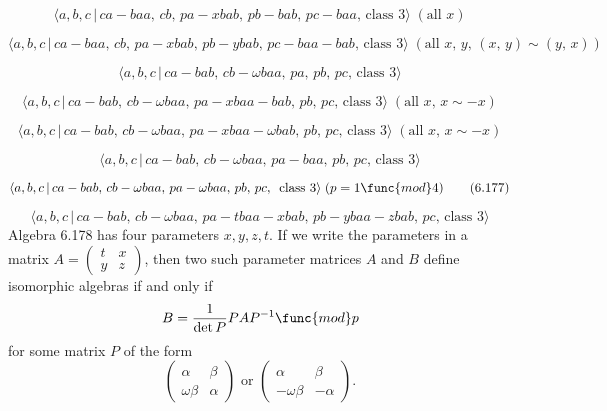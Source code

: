 \documentclass[10pt]{article}
\begin{document}
\begin{equation}
\langle a,b,c\,|\,ca-baa,\,cb,\,pa-xbab,\,pb-bab,\,pc-baa,\,\text{class }%
3\rangle\;(\text{all }x)  \tag{6.171}
\end{equation}

\begin{equation}
\langle a,b,c\,|\,ca-baa,\,cb,\,pa-xbab,\,pb-ybab,\,pc-baa-bab,\,\text{
class }3\rangle \;(\text{all }x,\,y,\,(x,\,y)\sim (y,\,x))  \tag{6.172}
\end{equation}

\begin{equation}
\langle a,b,c\,|\,ca-bab,\,cb-\omega baa,\,pa,\,pb,\,pc,\,\text{class }%
3\rangle  \tag{6.173}
\end{equation}

\begin{equation}
\langle a,b,c\,|\,ca-bab,\,cb-\omega baa,\,pa-xbaa-bab,\,pb,\,pc,\,\text{
class }3\rangle\;(\text{all }x,\, x\sim -x)  \tag{6.174}
\end{equation}

\begin{equation}
\langle a,b,c\,|\,ca-bab,\,cb-\omega baa,\,pa-xbaa-\omega bab,\,pb,\,pc,\,%
\text{class }3\rangle\;(\text{all }x,\, x\sim -x)  \tag{6.175}
\end{equation}

\begin{equation}
\langle a,b,c\,|\,ca-bab,\,cb-\omega baa,\,pa-baa,\,pb,\,pc,\,\text{class }%
3\rangle  \tag{6.176}
\end{equation}

\begin{equation}
\langle a,b,c\,|\,ca-bab,\,cb-\omega baa,\,pa-\omega baa,\,pb,\,pc,\,\text{
class }3\rangle\;(p=1 \func{mod} 4)  \tag{6.177}
\end{equation}

\begin{equation}
\langle a,b,c\,|\,ca-bab,\,cb-\omega
baa,\,pa-tbaa-xbab,\,pb-ybaa-zbab,\,pc,\,\text{class }3\rangle  \tag{6.178}
\end{equation}%
Algebra 6.178 has four parameters $x,y,z,t$. If we write the parameters in a
matrix $A=\left( 
\begin{array}{cc}
t & x \\ 
y & z%
\end{array}%
\right) $, then two such parameter matrices $A$ and $B$ define isomorphic
algebras if and only if%
\[
B=\frac{1}{\det P}PAP^{-1}\func{mod}p 
\]%
for some matrix $P$ of the form%
\[
\left( 
\begin{array}{ll}
\alpha & \beta \\ 
\omega \beta & \alpha%
\end{array}%
\right) \text{ or }\left( 
\begin{array}{ll}
\alpha & \beta \\ 
-\omega \beta & -\alpha%
\end{array}%
\right) . 
\]
\end{document}
